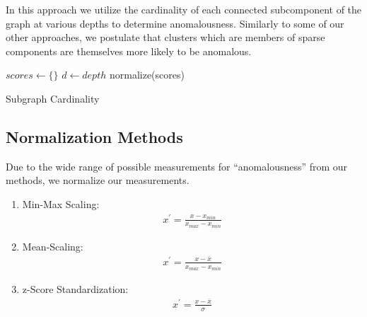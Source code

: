 In this approach we utilize the cardinality of each connected subcomponent of the graph at various depths to determine anomalousness.
Similarly to some of our other approaches, we postulate that clusters which are members of sparse components are themselves more likely to be anomalous.

\begin{algorithm}
\DontPrintSemicolon
\SetAlgoLined
{}
 $scores \leftarrow \{\}$\;
 $d \leftarrow depth$\;
 normalize(scores)\;
 \caption{Subgraph Cardinality}
 \label{alg-sgc}
\end{algorithm}

\subsection{Normalization Methods}

Due to the wide range of possible measurements for ``anomalousness'' from our methods, we normalize our measurements.

\begin{enumerate}
    \item Min-Max Scaling:
    \begin{gather}
        x^{\prime} = \frac{x - x_{min}}{x_{max} - x_{min}}
        \label{sec:methods:min-max-normalizationn}
    \end{gather}
    
    \item Mean-Scaling:
    \begin{gather}
        x^{\prime} = \frac{x - \overline{x}}{x_{max} - x_{min}}
        \label{sec:methods:mean-scaling}
    \end{gather}
    
    \item z-Score Standardization:
    \begin{gather}
        x^{\prime} = \frac{x - \overline{x}}{\sigma}
        \label{sec:methods:z-score}
    \end{gather}

\end{enumerate}
